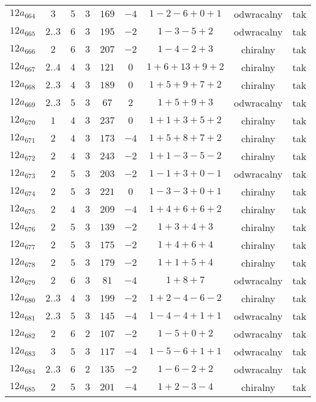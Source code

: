 \begin{longtable}{ccccccccc}
$12a_{664}$ & $3$ & $5$ & $3$ & $169$ & $-4$ & $1-2-6+0+1$ & odwracalny & tak \\
$12a_{665}$ & $2..3$ & $6$ & $3$ & $195$ & $-2$ & $1-3-5+2$ & odwracalny & tak \\
$12a_{666}$ & $2$ & $6$ & $3$ & $207$ & $-2$ & $1-4-2+3$ & chiralny & tak \\
$12a_{667}$ & $2..4$ & $4$ & $3$ & $121$ & $0$ & $1+6+13+9+2$ & chiralny & tak \\
$12a_{668}$ & $2..3$ & $4$ & $3$ & $189$ & $0$ & $1+5+9+7+2$ & chiralny & tak \\
$12a_{669}$ & $2..3$ & $5$ & $3$ & $67$ & $2$ & $1+5+9+3$ & odwracalny & tak \\
$12a_{670}$ & $1$ & $4$ & $3$ & $237$ & $0$ & $1+1+3+5+2$ & chiralny & tak \\
$12a_{671}$ & $2$ & $4$ & $3$ & $173$ & $-4$ & $1+5+8+7+2$ & chiralny & tak \\
$12a_{672}$ & $2$ & $4$ & $3$ & $243$ & $-2$ & $1+1-3-5-2$ & chiralny & tak \\
$12a_{673}$ & $2$ & $5$ & $3$ & $203$ & $-2$ & $1-1+3+0-1$ & odwracalny & tak \\
$12a_{674}$ & $2$ & $5$ & $3$ & $221$ & $0$ & $1-3-3+0+1$ & chiralny & tak \\
$12a_{675}$ & $2$ & $4$ & $3$ & $209$ & $-4$ & $1+4+6+6+2$ & chiralny & tak \\
$12a_{676}$ & $2$ & $5$ & $3$ & $139$ & $-2$ & $1+3+4+3$ & chiralny & tak \\
$12a_{677}$ & $2$ & $5$ & $3$ & $175$ & $-2$ & $1+4+6+4$ & chiralny & tak \\
$12a_{678}$ & $2$ & $5$ & $3$ & $179$ & $-2$ & $1+1+5+4$ & chiralny & tak \\
$12a_{679}$ & $2$ & $6$ & $3$ & $81$ & $-4$ & $1+8+7$ & odwracalny & tak \\
$12a_{680}$ & $2..3$ & $4$ & $3$ & $199$ & $-2$ & $1+2-4-6-2$ & chiralny & tak \\
$12a_{681}$ & $2..3$ & $5$ & $3$ & $145$ & $-4$ & $1-4-4+1+1$ & odwracalny & tak \\
$12a_{682}$ & $2$ & $6$ & $2$ & $107$ & $-2$ & $1-5+0+2$ & odwracalny & tak \\
$12a_{683}$ & $3$ & $5$ & $3$ & $117$ & $-4$ & $1-5-6+1+1$ & odwracalny & tak \\
$12a_{684}$ & $2..3$ & $6$ & $2$ & $135$ & $-2$ & $1-6-2+2$ & odwracalny & tak \\
$12a_{685}$ & $2$ & $5$ & $3$ & $201$ & $-4$ & $1+2-3-4$ & chiralny & tak \\

\end{longtable}
